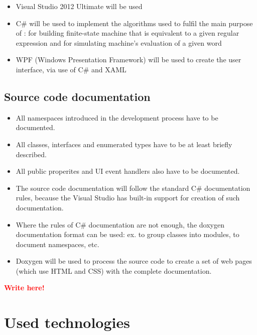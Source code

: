 \documentclass{article}
\newcommand{\writehere}{\textbf{\textcolor{red}{Write here!}}}
\begin{document}
\begin{itemize}

  \item Visual Studio 2012 Ultimate will be used
  
  \item C\# will be used to implement the algorithms used to fulfil the main purpose of
  \titletext{}: for building finite-state machine that is equivalent to a given regular expression
  and for simulating machine's evaluation of a given word

  \item WPF (Windows Presentation Framework) will be used to create the user interface, via use of
  C\# and XAML

\end{itemize}

\subsection{Source code documentation}

\begin{itemize}

  \item All namespaces introduced in the development process have to be documented. 

  \item All classes, interfaces and enumerated types have to be at least briefly described. 

  \item All public properites and UI event handlers also have to be documented.

  \item The source code documentation will follow the standard C\# documentation rules, because the
  Visual Studio has built-in support for creation of such documentation.

  \item Where the rules of C\# documentation are not enough, the doxygen documentation format can be
  used: ex. to group classes into modules, to document namespaces, etc.

  \item Doxygen will be used to process the source code to create a set of web pages (which use HTML
  and CSS) with the complete documentation.

\end{itemize}

\writehere

\section{Used technologies}
\end{document}

